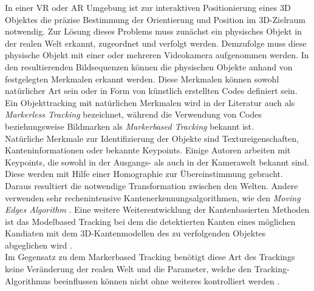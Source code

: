 In einer VR oder AR Umgebung ist zur interaktiven Positionierung eines 3D Objektes die präzise Bestimmung der Orientierung und Position im 3D-Zielraum notwendig. Zur Lösung dieses Problems muss zunächst ein physisches Objekt in der realen Welt erkannt, zugeordnet und verfolgt werden. Demzufolge muss diese physische Objekt mit einer oder mehreren Videokamera aufgenommen werden. In den resultierenden Bildsequenzen können die physischen Objekte anhand von festgelegten Merkmalen erkannt werden. Diese Merkmalen können sowohl natürlicher Art sein oder in Form von künstlich erstellten Codes definiert sein. Ein Objekttracking mit natürlichen Merkmalen wird in der Literatur auch als \textit{Markerless Tracking} bezeichnet, während die Verwendung von Codes beziehungsweise Bildmarken als \textit{Markerbased Tracking} bekannt ist.\\
Natürliche Merkmale zur Identifizierung der Objekte sind Textureigenschaften, Kanteninformationen oder bekannte Keypoints. Einige Autoren \cite{article:MarkerLessBarandiaran2010}\cite{article:MarkerLessWagner:}\cite{article:MarkerLessComport}\cite{article:MarkerLessLowe} arbeiten mit Keypoints, die sowohl in der Ausgangs- als auch in der Kamerawelt bekannt sind. Diese werden mit Hilfe einer Homographie zur Übereinstimmung gebracht. Daraus resultiert die notwendige Transformation zwischen den Welten. Andere verwenden sehr rechenintensive Kantenerkennungsalgorithmen, wie den \textit{Moving Edges Algorithm} \cite{article:MarkerLessEdgeMarchand}. Eine weitere Weiterentwicklung der Kantenbasierten Methoden ist das Modelbased Tracking bei dem die detektierten Kanten eines möglichen Kandiaten mit dem 3D-Kantenmodellen des zu verfolgenden Objektes abgeglichen wird \cite{article:MarkerLessModellVacchetti}\cite{article:MarkerLessEdgeAlvarez}\cite{article:MarkerLessEdgeWu}\cite{article:MarkerLessBlasko}. \\
Im Gegensatz zu dem Markerbased Tracking benötigt diese Art des Trackings keine Veränderung der realen Welt und die Parameter, welche den Tracking-Algorithmus beeinflussen können nicht ohne weiteres kontrolliert werden \cite{article:MarkerLessBarandiaran2010}.

